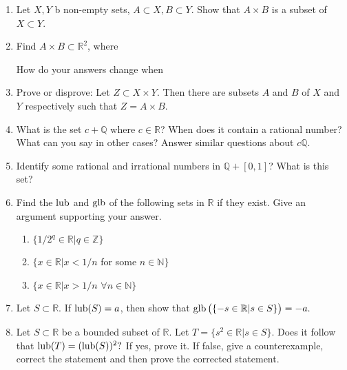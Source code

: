 \begin{enumerate}[label=(\arabic*)]
    \item Let $X, Y$ b non-empty sets, $A\subset X, B \subset Y$. Show that $A\times B$ is a subset of $X \subset Y$.
    \item Find $A\times B\subset \mathbb{R}^2$, where\\
    How do your answers change when 
    \begin{enumerate*}[label=(\roman*)]
        \item $A$ and $B$ are interchanged.\\
        \item $B=\mathbb{R}$ is replaced by $B = \mathbb{Z}$?
        \item $B = \mathbb{R}$ is replace by $[0, \infty)$
    \end{enumerate*}
    \item Prove or disprove: Let $Z\subset X\times Y$. Then there  are subsets $A$ and $B$ of $X$ and $Y$ respectively such that $Z = A \times B.$
    \item What is the set $c + \mathbb{Q}$ where $c \in \mathbb{R}$? When does it contain a rational number?\\
    What can you say in other cases? Answer similar questions about $c\mathbb{Q}$.
    \item Identify some rational and irrational numbers in $\mathbb{Q} + [0, 1]$? What is this set?
    \item Find the $\operatorname{lub}$ and $\operatorname{glb}$ of the following sets in $\mathbb{R}$ if they exist. Give an argument supporting your answer.
    \begin{enumerate}[nosep]
        \item $\{1/2^q \in \mathbb{R}|q\in\mathbb{Z}\}$
        \item $\{x \in \mathbb{R}|x < 1/n$ for some $n \in \mathbb{N}\}$
        \item $\{x \in \mathbb{R}| x > 1/n$ $\forall n\in \mathbb{N}\}$
    \end{enumerate}
    \item Let $S \subset \mathbb{R}$. If $\operatorname{lub}(S) = a$, then show that $\operatorname{glb}\big(\{-s\in\mathbb{R}|s\in S\}\big)=-a.$
    \item Let $S \subset \mathbb{R}$ be a bounded subset of $\mathbb{R}$. Let $T = \{s^2\in\mathbb{R}|s\in S\}$. Does it follow that $\operatorname{lub}(T)=(\operatorname{lub}(S))^2?$ If yes, prove it. If false, give a counterexample, correct the statement and then prove the corrected statement.
\end{enumerate}